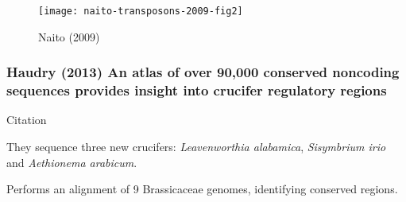       \begin{figure}[h!]
        \centering
        \texttt{[image: naito-transposons-2009-fig2]}
        \caption{Naito (2009) \cite{naito_unexpected_2009}}
      \end{figure}
      \FloatBarrier

    \subsubsection{Haudry (2013) An atlas of over 90,000 conserved
    noncoding sequences provides insight into crucifer regulatory regions}

      Citation \cite{haudry_atlas_2013}

      They sequence three new crucifers: \textit{Leavenworthia alabamica},
      \textit{Sisymbrium irio} and \textit{Aethionema arabicum}.

      Performs an alignment of 9 Brassicaceae genomes, identifying
      conserved regions.


